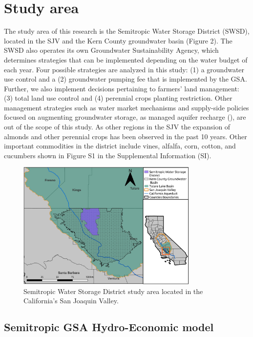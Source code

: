 \documentclass[a4paper,fleqn]{cas-sc}
\begin{document}
\section{Study area}


The study area of this research is the Semitropic Water Storage District (SWSD), located in the SJV and the Kern County groundwater basin (Figure 2). The SWSD also operates its own Groundwater Sustainability Agency, which  determines strategies that can be implemented depending on the water budget of each year. Four possible strategies are analyzed in this study: (1) a groundwater use control and a (2) groundwater pumping fee that is implemented by the GSA. Further, we also implement decisions pertaining to farmers’ land management: (3) total land use control and (4) perennial crops planting restriction. Other management strategies such as water market mechanisms and supply-side policies focused on augmenting groundwater storage, as managed aquifer recharge (\citep{ulibarri_assessing_2021}), are out of the scope of this study. As other regions in the SJV the expansion of almonds and other perennial crops has been observed in the past 10 years. Other important commodities in the district include vines, alfalfa, corn, cotton, and cucumbers shown in Figure S1 in the Supplemental Information (SI). 
  

\begin{figure}[H]
    \centering
    \includegraphics[width=0.8\textwidth]{Map_Semitropic.jpg}
    \caption{Semitropic Water Storage District study area located in the California’s San Joaquin Valley.}
    \label{fig:1}
\end{figure}

\subsection{Semitropic GSA Hydro-Economic model}
\end{document}
